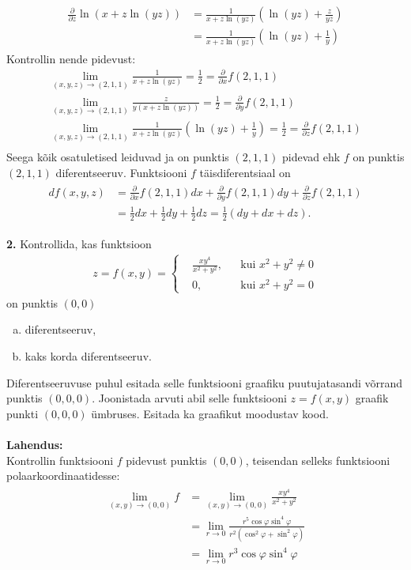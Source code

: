 \documentclass{article}
\newcommand{\p}[1]{\frac{\partial}{\partial #1}}
\begin{document}
\begin{enumerate}[(a)]
\begin{gather*}
\begin{aligned}
\p{z}\ln(x+z\ln(yz))&=\frac{1}{x+z\ln(yz)}\left(\ln(yz)+\frac{z}{yz}\right)\\
&=\frac{1}{x+z\ln(yz)}\left(\ln(yz)+\frac{1}{y}\right)
\end{aligned}
\end{gather*}
Kontrollin nende pidevust:
\begin{gather*}
\lim_{(x,y,z)\to(2,1,1)}\frac{1}{x+z\ln(yz)}=\frac{1}{2}=\p{x}f(2,1,1)\\
\lim_{(x,y,z)\to(2,1,1)}\frac{z}{y(x+z\ln(yz))}=\frac{1}{2}=\p{y}f(2,1,1)\\
\lim_{(x,y,z)\to(2,1,1)}\frac{1}{x+z\ln(yz)}\left(\ln(yz)+\frac{1}{y}\right)=\frac{1}{2}=\p{z}f(2,1,1)\\
\end{gather*}
Seega kõik osatuletised leiduvad ja on punktis $(2,1,1)$ pidevad ehk $f$ on punktis $(2,1,1)$ diferentseeruv. Funktsiooni $f$ täisdiferentsiaal on 
\begin{gather*}
\begin{aligned}
df(x,y,z)&=\p{x}f(2,1,1)dx+\p{y}f(2,1,1)dy+\p{z}f(2,1,1)\\
&=\frac{1}{2}dx+\frac{1}{2}dy+\frac{1}{2}dz=\frac{1}{2}(dy+dx+dz).
\end{aligned}
\end{gather*}
\end{enumerate}
\pagebreak
\textbf{2.} Kontrollida, kas funktsioon
\begin{gather*}
z=f(x,y)=
\left\{\begin{aligned}
&\frac{xy^4}{x^2+y^2}, && \text{kui }x^2+y^2\neq 0\\
&0, && \text{kui }x^2+y^2=0
\end{aligned}
\right.
\end{gather*}
on punktis $(0,0)$
\begin{enumerate}[a)]
\item diferentseeruv,
\item kaks korda diferentseeruv.
\end{enumerate}
Diferentseeruvuse puhul esitada selle funktsiooni graafiku puutujatasandi võrrand punktis $(0,0,0)$. Joonistada arvuti abil selle funktsiooni $z=f(x,y)$ graafik punkti $(0,0,0)$ ümbruses. Esitada ka graafikut moodustav kood.\\\\
\textbf{Lahendus:}\\
Kontrollin funktsiooni $f$ pidevust punktis $(0,0)$, teisendan selleks funktsiooni polaarkoordinaatidesse:
\begin{gather*}
\begin{aligned}
\lim_{(x,y)\to(0,0)}f&=\lim_{(x,y)\to(0,0)}\frac{xy^4}{x^2+y^2}\\
&=\lim_{r\to 0}\frac{r^5\cos\varphi\sin^4\varphi}{r^2(\cos^2\varphi+\sin^2\varphi)}\\
&=\lim_{r\to 0}r^3\cos\varphi\sin^4\varphi
\end{aligned}
\end{gather*}
\end{document}
